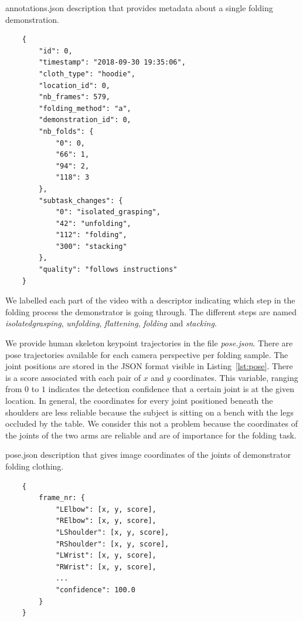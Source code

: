 \documentclass[\home/main.tex]{subfiles}
\begin{document}
\begin{listing}[htb]
    \caption{annotations.json description that provides metadata about a single folding demonstration.}
    \label{lst:annotations}
    \begin{verbatim}
    {
        "id": 0,
        "timestamp": "2018-09-30 19:35:06",
        "cloth_type": "hoodie",
        "location_id": 0,
        "nb_frames": 579,
        "folding_method": "a",
        "demonstration_id": 0,
        "nb_folds": {
            "0": 0,
            "66": 1,
            "94": 2,
            "118": 3
        },
        "subtask_changes": {
            "0": "isolated_grasping",
            "42": "unfolding",
            "112": "folding",
            "300": "stacking"
        },
        "quality": "follows instructions"
    }
    \end{verbatim}
\end{listing}



We labelled each part of the video with a descriptor indicating which step in the folding process the demonstrator is going through. The different steps are named \textit{isolated\textunderscore grasping}, \textit{unfolding}, \textit{flattening}, \textit{folding} and \textit{stacking}. 

We provide human skeleton keypoint trajectories in the file \textit{pose.json}. There are pose trajectories available for each camera perspective per folding sample. The joint positions are stored in the JSON format visible in Listing~\ref{lst:pose}. There is a score associated with each pair of $x$ and $y$ coordinates. This variable, ranging from $0$ to $1$ indicates the detection confidence that a certain joint is at the given location. In general, the coordinates for every joint positioned beneath the shoulders are less reliable because the subject is sitting on a bench with the legs occluded by the table. We consider this not a problem because the coordinates of the joints of the two arms are reliable and are of importance for the folding task. 


\begin{listing}[htb]
    \caption{pose.json description that gives image coordinates of the joints of demonstrator folding clothing.}
    \label{lst:pose}
    \begin{verbatim}
    {
        frame_nr: {
            "LElbow": [x, y, score],
            "RElbow": [x, y, score],
            "LShoulder": [x, y, score],
            "RShoulder": [x, y, score],
            "LWrist": [x, y, score],
            "RWrist": [x, y, score],
            ... 
            "confidence": 100.0
        }
    }
    \end{verbatim}
\end{listing}
\end{document}
